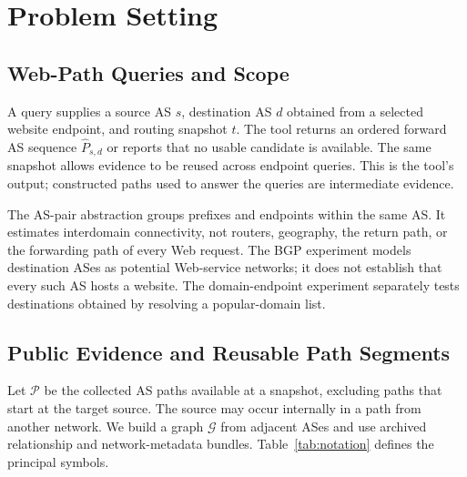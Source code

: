 \documentclass[sigconf,anonymous,review]{acmart}
\begin{document}
\section{Problem Setting}
\label{sec:problem}

\subsection{Web-Path Queries and Scope}

A query supplies a source AS $s$, destination AS $d$ obtained from a selected
website endpoint, and routing snapshot $t$. The tool returns an ordered
forward AS sequence $\widehat P_{s,d}$ or reports that no usable candidate is
available. The same snapshot allows evidence to be reused across endpoint
queries. This is the tool's output;
constructed paths used to answer the queries are intermediate evidence.

The AS-pair abstraction groups prefixes and endpoints within the same AS.
It estimates interdomain connectivity, not routers, geography, the return
path, or the forwarding path of every Web request. The BGP experiment models
destination ASes as potential Web-service networks; it does not establish
that every such AS hosts a website. The domain-endpoint experiment separately
tests destinations obtained by resolving a popular-domain list.

\subsection{Public Evidence and Reusable Path Segments}

Let $\mathcal P$ be the collected AS paths available at a snapshot, excluding
paths that start at the target source. The source may occur internally in a
path from another network. We build a graph $\mathcal G$ from adjacent ASes
and use archived relationship and network-metadata bundles.
Table~\ref{tab:notation} defines the principal symbols.
\end{document}
